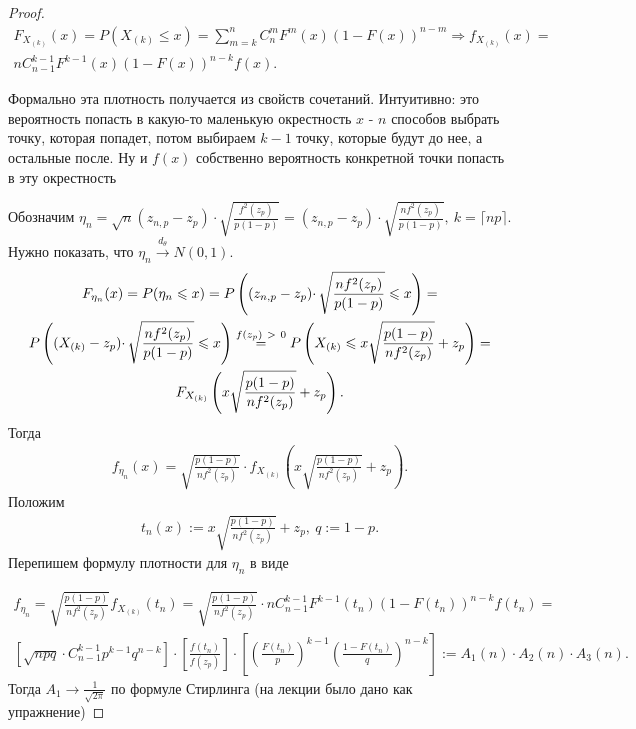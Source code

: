 \begin{proof}
\begin{gather*}
   F_{X_{( k)}}( x) =P( X_{( k)} \leqslant x) =\sum _{m=k}^{n} C_{n}^{m} F^{m}( x)( 1-F( x))^{n-m} \Rightarrow f_{X_{( k)}}( x) =\\ nC_{n-1}^{k-1} F^{k-1}( x)( 1-F( x))^{n-k} f( x). 
\end{gather*}

Формально эта плотность получается из свойств сочетаний. Интуитивно: это вероятность попасть в какую-то маленькую окрестность $x$ - $n$ способов выбрать точку, которая попадет, потом выбираем $k-1$ точку, которые будут до нее, а остальные после. Ну и $f(x)$ собственно вероятность конкретной точки попасть в эту окрестность

Обозначим $\displaystyle \eta _{n} =\sqrt{n}( z_{n,p} -z_{p}) \cdotp \sqrt{\frac{f^{2}( z_{p})}{p( 1-p)}} =( z_{n,p} -z_{p}) \cdotp \sqrt{\frac{nf^{2}( z_{p})}{p( 1-p)}},\ k=\lceil np\rceil $. Нужно показать, что $\displaystyle \eta _{n}\xrightarrow{d_{\theta }} N( 0,1)$.
\begin{gather*}
    F_{\eta _{n}}( x) = P( \eta _{n} \leqslant x) = P\left(( z_{n,p} -z_{p}) \cdotp \sqrt{\frac{nf^{2}( z_{p})}{p( 1-p)}} \leqslant x\right) =\\ P\left(( X_{( k)} -z_{p}) \cdotp \sqrt{\frac{nf^{2}( z_{p})}{p( 1-p)}} \leqslant x\right)\overset{f( z_{p}) \  >\ 0}{=}\notag P\left( X_{( k)} \leqslant x\sqrt{\frac{p( 1-p)}{nf^{2}( z_{p})}} +z_{p}\right) =\\ F_{X_{( k)}}\left( x\sqrt{\frac{p( 1-p)}{nf^{2}( z_{p})}} +z_{p}\right) .
\end{gather*}
 Тогда
 \begin{gather*}
     f_{\eta _{n}}( x) =\sqrt{\frac{p( 1-p)}{nf^{2}( z_{p})}}\cdot f_{X_{( k)}}\left( x\sqrt{\frac{p( 1-p)}{nf^{2}( z_{p})}} +z_{p}\right).
 \end{gather*} Положим 
\begin{gather*}
    t_{n}( x) :=x\sqrt{\frac{p( 1-p)}{nf^{2}( z_{p})}} +z_{p},\ q:=1-p.
\end{gather*} 
Перепишем формулу плотности для $\displaystyle \eta _{n}$ в виде

\begin{gather*}
f_{\eta _{n}} = \sqrt{\frac{p( 1-p)}{nf^{2}( z_{p})}} f_{X_{( k)}}( t_{n}) = \sqrt{\frac{p( 1-p)}{nf^{2}( z_{p})}} \cdotp nC_{n-1}^{k-1} F^{k-1}( t_{n})( 1-F( t_{n}))^{n-k} f( t_{n}) =\\ \left[\sqrt{npq} \cdotp C_{n-1}^{k-1} p^{k-1} q^{n-k}\right] \cdotp \left[\frac{f( t_{n})}{f( z_{p})}\right] \cdotp \left[\left(\frac{F( t_{n})}{p}\right)^{k-1}\left(\frac{1-F( t_{n})}{q}\right)^{n-k}\right] := A_1(n) \cdot A_2(n) \cdot A_3(n) .
\end{gather*}
Тогда $A_1 \rightarrow \frac{1}{\sqrt{2 \pi}}$ по формуле Стирлинга (на лекции было дано как упражнение)


\end{proof}
